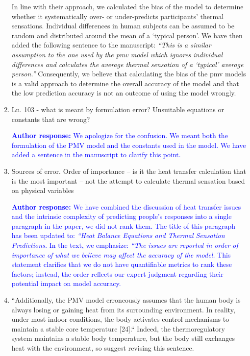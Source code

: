 \documentclass[a4paper, 10pt]{letter}
\newcommand{\response}[1]{\textcolor{blue}{\textbf{Author response:} #1}}
\begin{document}
\begin{letter}
\begin{enumerate}
{                In line with their approach, we calculated the bias of the model to determine whether it systematically over- or under-predicts participants’ thermal sensations.
                Individual differences in human subjects can be assumed to be random and distributed around the mean of a `typical person'.
                We have then added the following sentence to the manuscript: \textit{``This is a similar assumption to the one used by the \ac{pmv} model which ignores individual differences and calculates the average thermal sensation of a `typical' average person.''}
                Consequently, we believe that calculating the bias of the \ac{pmv} models is a valid approach to determine the overall accuracy of the model and that the low prediction accuracy is not an outcome of using the model wrongly.
            }

            \item Ln. 103 - what is meant by formulation error?
            Unsuitable equations or constants that are wrong?

            \response{
                We apologize for the confusion.
                We meant both the formulation of the PMV model and the constants used in the model.
                We have added a sentence in the manuscript to clarify this point.
            }

            \item Sources of error.
            Order of importance -- is it the heat transfer calculation that is the most important -- not the attempt to calculate thermal sensation based on physical variables

            \response{We have combined the discussion of heat transfer issues and the intrinsic complexity of predicting people’s responses into a single paragraph in the paper, we did not rank them. 
            The title of this paragraph has been updated to: \textit{``Heat Balance Equations and Thermal Sensation Predictions.} 
            In the text, we emphasize: \textit{``The issues are reported in order of importance of what we believe may affect the accuracy of the model.} 
            This statement clarifies that we do not have quantifiable metrics to rank these factors; instead, the order reflects our expert judgment regarding their potential impact on model accuracy.}

            \item ``Additionally, the PMV model erroneously assumes that the human body is always losing or gaining heat from its surrounding environment.
            In reality, under most indoor conditions, the body activates control mechanisms to maintain a stable core temperature [24].``
            Indeed, the thermoregulatory system maintains a stable body temperature, but the body still exchanges heat with the environment, so suggest revising this sentence.


\end{enumerate}
\end{letter}
\end{document}

